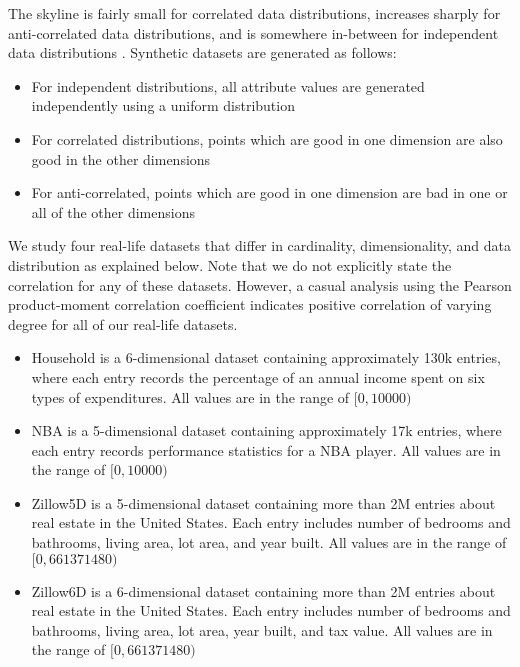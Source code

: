 \documentclass[12pt,a4paper,twoside]{report}
\begin{document}
The skyline is fairly small for correlated data distributions,
increases sharply for anti-correlated data distributions, and is
somewhere in-between for independent data distributions
\cite{borzsony2001skyline}. Synthetic datasets are generated as
follows:

\begin{itemize}
	\item For independent distributions, all attribute values are
	generated independently using a uniform distribution
	\item For correlated distributions, points which are good in one
	dimension are also good in the other dimensions
	\item For anti-correlated, points which are good in one dimension
	are bad in one or all of the other dimensions
\end{itemize}

We study four real-life datasets that differ in cardinality,
dimensionality, and data distribution as explained below. Note that we
do not explicitly state the correlation for any of these datasets.
However, a casual analysis using the Pearson product-moment
correlation coefficient indicates positive correlation of varying
degree for all of our real-life datasets.

\begin{itemize}

	\item Household is a 6-dimensional dataset containing
	approximately 130k entries, where each entry records the
	percentage of an annual income spent on six types of expenditures.
	All values are in the range of $[0,10000)$

	\item NBA is a 5-dimensional dataset containing approximately 17k
	entries, where each entry records performance statistics for a NBA
	player. All values are in the range of $[0,10000)$

	\item Zillow5D is a 5-dimensional dataset containing more than 2M
	entries about real estate in the United States. Each entry
	includes number of bedrooms and bathrooms, living area, lot area,
	and year built. All values are in the range of $[0,661371480)$

	\item Zillow6D is a 6-dimensional dataset containing more than 2M
	entries about real estate in the United States. Each entry
	includes number of bedrooms and bathrooms, living area, lot area,
	year built, and tax value. All values are in the range of $[0,661371480)$

\end{itemize}
\end{document}
